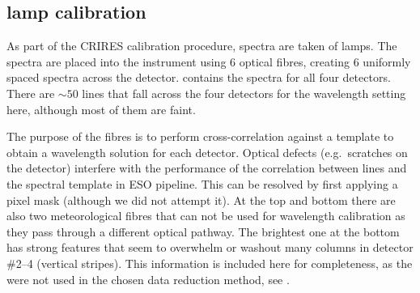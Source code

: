\subsection{\thar{} lamp calibration}
\label{subsec:th-ar}
As part of the {CRIRES} calibration procedure, spectra are taken of \thar{} lamps.
The \thar{} spectra are placed into the instrument using 6 optical fibres, creating 6 uniformly spaced spectra across the detector.
 contains the \thar{} spectra for all four detectors.
There are \(\sim50\) \thar{} lines that fall across the four detectors for the wavelength setting here, although most of them are faint.

The purpose of the \thar{} fibres is to perform cross-correlation against a \thar{} template to obtain a wavelength solution for each detector.
Optical defects (e.g.\ scratches on the detector) interfere with the performance of the correlation between \thar{} lines and the spectral template in {ESO} pipeline.
This can be resolved by first applying a pixel mask (although we did not attempt it).
At the top and bottom there are also two meteorological fibres that can not be used for wavelength calibration as they pass through a different optical pathway.
The brightest one at the bottom has strong features that seem to overwhelm or washout many columns in detector \#2--4 (vertical stripes). 
This information is included here for completeness, as the \thar{} were not used in the chosen data reduction method, see .



